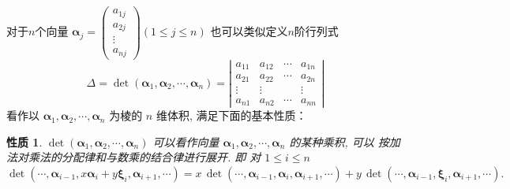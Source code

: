 \documentclass[10pt,punct]{ctexbeamer}
\newtheorem{pr3}{性质}
\begin{document}
\begin{frame}
    对于$n$个向量 $\boldsymbol{\alpha}_j=\left(\begin{array}{c}a_{1 j} \\ a_{2 j} \\ \vdots \\ a_{n j}\end{array}\right) \left( 1 \leqslant j \leqslant n\right)$
    也可以类似定义\alert{$n$阶行列式} $$\Delta=\operatorname{det}\left(\boldsymbol{\alpha}_1, \boldsymbol{\alpha}_2, \cdots, \boldsymbol{\alpha}_n\right)=\left|\begin{array}{cccc}a_{11} & a_{12} & \cdots & a_{1 n} \\ a_{21} & a_{22} & \cdots & a_{2 n} \\ \vdots & \vdots & & \vdots \\ a_{n 1} & a_{n 2} & \cdots & a_{n n}\end{array}\right|$$
    看作以 $\boldsymbol{\alpha}_1, \boldsymbol{\alpha}_2, \cdots, \boldsymbol{\alpha}_n$ 为棱的 \alert{$n$ 维体积}, 满足下面的基本性质：
    \begin{pr3}
        $ \operatorname{det}\left(\boldsymbol{\alpha}_1, \boldsymbol{\alpha}_2, \cdots, \boldsymbol{\alpha}_n\right)$ 可以看作向量 $\boldsymbol{\alpha}_1, \boldsymbol{\alpha}_2, \cdots, \boldsymbol{\alpha}_n$ 的某种乘积, 可以 按加法对乘法的分配律和与数乘的结合律进行展开. 即 对 $1 \leqslant i \leqslant n$
        $\operatorname{det}\left(\cdots, \boldsymbol{\alpha}_{i-1}, x \boldsymbol{\alpha}_i+y \boldsymbol{\xi}_i, \boldsymbol{\alpha}_{i+1}, \cdots\right)=x\, \operatorname{det}\left(\cdots, \boldsymbol{\alpha}_{i-1}, \boldsymbol{\alpha}_i, \boldsymbol{\alpha}_{i+1}, \cdots\right)+y\, \operatorname{det}\left(\cdots, \boldsymbol{\alpha}_{i-1}, \boldsymbol{\xi}_i, \boldsymbol{\alpha}_{i+1}, \cdots\right).$

    \end{pr3}
\end{frame}
\end{document}
